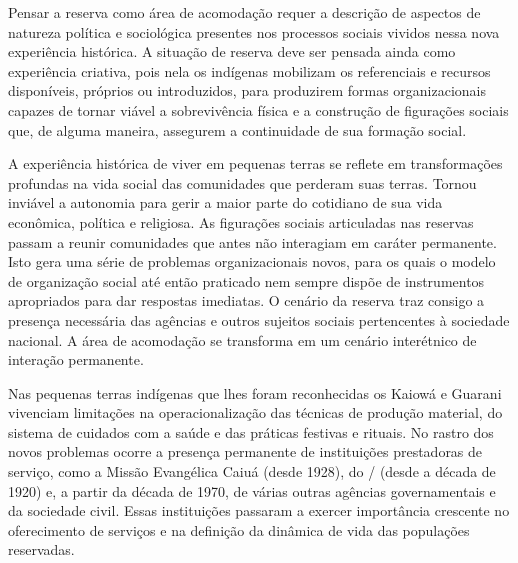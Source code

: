 Pensar a reserva como área de acomodação requer a descrição de aspectos
de natureza política e sociológica presentes nos processos sociais
vividos nessa nova experiência histórica. A situação de reserva deve
ser pensada ainda como experiência criativa, pois nela os indígenas
mobilizam os referenciais e recursos disponíveis, próprios ou
introduzidos, para produzirem formas organizacionais capazes de tornar
viável a sobrevivência física e a construção de figurações sociais que,
de alguma maneira, assegurem a continuidade de sua formação social. 

A experiência histórica de viver em pequenas terras se reflete em
transformações profundas na vida social das comunidades que perderam
suas terras. Tornou inviável a autonomia para gerir a maior parte do
cotidiano de sua vida econômica, política e religiosa. As figurações
sociais articuladas nas reservas passam a reunir comunidades que antes
não interagiam em caráter permanente. Isto gera uma série de problemas
organizacionais novos, para os quais o modelo de organização social até
então praticado nem sempre dispõe de instrumentos apropriados para dar
respostas imediatas. O cenário da reserva traz consigo a presença necessária das
agências e outros sujeitos sociais pertencentes à sociedade nacional. A
área de acomodação se transforma em um cenário interétnico de interação
permanente.

Nas pequenas terras indígenas que lhes foram reconhecidas os Kaiowá e
Guarani vivenciam limitações na operacionalização das técnicas de
produção material, do sistema de cuidados com a saúde e das práticas
festivas e rituais. No rastro dos novos problemas ocorre a presença
permanente de instituições prestadoras de serviço, como a Missão
Evangélica Caiuá (desde 1928), do / (desde a década de 1920) e,
a partir da década de 1970, de várias outras agências governamentais e
da sociedade civil. Essas instituições passaram a exercer importância
crescente no oferecimento de serviços e na definição da dinâmica de
vida das populações reservadas.

